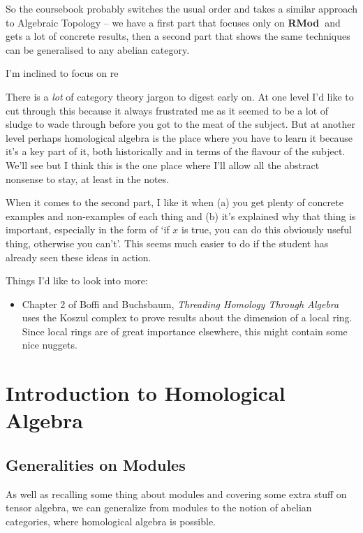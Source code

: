 \documentclass[oneside,english]{amsbook}
\numberwithin{section}{chapter}
\theoremstyle{plain}
\theoremstyle{definition}
\newcommand{\catname}[1]{{\normalfont\textbf{#1}}}
\newcommand{\RMod}{\catname{RMod\ }}
\begin{document}
		So the coursebook probably switches the usual order and takes a similar approach to Algebraic Topology -- we have a first part that focuses only on \RMod and gets a lot of concrete results, then a second part that shows the same techniques can be generalised to any abelian category.
		
		I'm inclined to focus on re
		
		
		
		There is a \emph{lot} of category theory jargon to digest early on. At one level I'd like to cut through this because it always frustrated me as it seemed to be a lot of sludge to wade through before you got to the meat of the subject. But at another level perhaps homological algebra is the place where you have to learn it because it's a key part of it, both historically and in terms of the flavour of the subject. We'll see but I think this is the one place where I'll allow all the abstract nonsense to stay, at least in the notes.
		
		When it comes to the second part, I like it when (a) you get plenty of concrete examples and non-examples of each thing and (b) it's explained why that thing is important, especially in the form of `if $x$ is true, you can do this obviously useful thing, otherwise you can't'. This seems much easier to do if the student has already seen these ideas in action.
	
		Things I'd like to look into more:
		\begin{itemize}
			\item Chapter 2 of Boffi and Buchsbaum, \textit{Threading Homology Through Algebra} uses the Koszul complex to prove results about the dimension of a local ring. Since local rings are of great importance elsewhere, this might contain some nice nuggets.
		\end{itemize}

	\part{Introduction to Homological Algebra}
	
	\chapter{Generalities on Modules}
	
	As well as recalling some thing about modules and covering some extra stuff on tensor algebra, we can generalize from modules to the notion of abelian categories, where homological algebra is possible.
	
\end{document}

